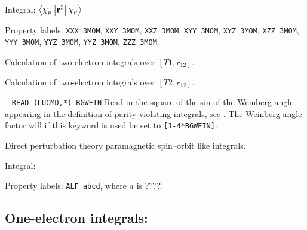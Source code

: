 \begin{description}
\begin{list}{}{}
\item Integral: $\left<\chi_{\mu}\left|{\bf r}^3\right|\chi_{\nu}\right>$
\item Property labels: \verb|XXX 3MOM|, \verb|XXY 3MOM|, \verb|XXZ 3MOM|, 
\verb|XYY 3MOM|, \verb|XYZ 3MOM|, \verb|XZZ 3MOM|, \verb|YYY 3MOM|, 
\verb|YYZ 3MOM|, \verb|YYZ 3MOM|, \verb|ZZZ 3MOM|. 
\end{list}

\item[\Key{U12INT}] Calculation of two-electron integrals over
  $\left[T1,r_{12}\right]$.

\item[\Key{U21INT}] Calculation of two-electron integrals over
  $\left[T2,r_{12}\right]$.

\item[\Key{WEINBG}]\verb| |\newline
\verb|READ (LUCMD,*) BGWEIN|\newline
Read in the square of the sin of the Weinberg angle appearing in the
definition of parity-violating integrals, see . The
Weinberg angle factor will if this keyword is used be set to
\verb|[1-4*BGWEIN]|. 

\item[\Key{XDDXR3}] Direct perturbation theory paramagnetic
  spin--orbit like integrals. 

\begin{list}{}{}
\item Integral:
\item Property labels: \verb|ALF abcd|, where $a$ is ????.
\end{list}

\end{description}


\subsection{One-electron integrals: }
\label{sec:oneinp}

